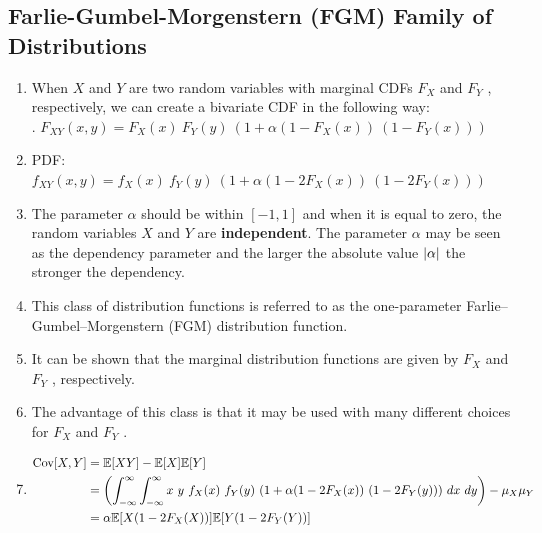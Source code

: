 \subsection{Farlie-Gumbel-Morgenstern (FGM) Family of Distributions}

\begin{enumerate}
    \item When $X$ and $Y$ are two random variables with marginal CDFs $F_X$ and $F_Y$ , respectively, we can create a bivariate CDF in the following way:
    \hfill \cite{statistics/book/Statistics-for-Data-Scientists/Maurits-Kaptein}
    \\[0.3cm]
    .\hfill
    $
        F _{X Y} (x, y) = F_X (x)\ F_Y (y)\ (1 + \alpha(1 - F_X (x))\ (1 - F_Y (x)))
    $
    \hfill \cite{statistics/book/Statistics-for-Data-Scientists/Maurits-Kaptein}

    \item PDF:
    $
        f _{X Y} (x, y) = f_X (x)\ f_Y (y)\ (1 + \alpha(1 - 2F_X (x))\ (1 - 2F_Y (x)))
    $
    \hfill \cite{statistics/book/Statistics-for-Data-Scientists/Maurits-Kaptein}

    \item The parameter $\alpha$ should be within $[-1, 1]$ and when it is equal to zero, the random variables $X$ and $Y$ are \textbf{independent}.
    The parameter $\alpha$ may be seen as the dependency parameter and the larger the absolute value $\left| \alpha \right|$ the stronger the dependency.
    \hfill \cite{statistics/book/Statistics-for-Data-Scientists/Maurits-Kaptein}

    \item This class of distribution functions is referred to as the one-parameter Farlie–Gumbel–Morgenstern (FGM) distribution function.
    \hfill \cite{statistics/book/Statistics-for-Data-Scientists/Maurits-Kaptein}

    \item It can be shown that the marginal distribution functions are given by $F_X$ and $F_Y$ , respectively.
    \hfill \cite{statistics/book/Statistics-for-Data-Scientists/Maurits-Kaptein}

    \item The advantage of this class is that it may be used with many different choices for $F_X$ and $F_Y$ .
    \hfill \cite{statistics/book/Statistics-for-Data-Scientists/Maurits-Kaptein}

    \item
    $
        \begin{aligned}
            \text{Cov}[X, Y]
            &= \mathbb{E}[X Y] - \mathbb{E}[X] \mathbb{E}[Y] \\
            & = \left(\displaystyle\int^\infty_{-\infty} \displaystyle\int^\infty_{-\infty} x\ y\ f_X (x)\ f_Y (y)\ (1 + \alpha(1 - 2F_X (x))\ (1 - 2F_Y (y)))\ dx\ dy\right) - \mu_X \mu_Y \\
            &= \alpha\mathbb{E}[X (1 - 2F_X (X ))]\mathbb{E}[Y (1 - 2F_Y (Y ))]
        \end{aligned}
    $
    \hfill \cite{statistics/book/Statistics-for-Data-Scientists/Maurits-Kaptein}


\end{enumerate}
